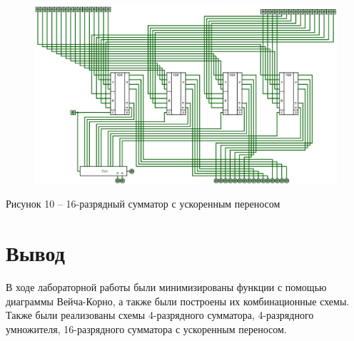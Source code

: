 \documentclass[a4paper,14pt]{extarticle}
\begin{document}
  \begin{figure}[h]
    \centering
    \includegraphics[width=1\linewidth]{images/s-4-4}
  \end{figure}
  \begin{center}
    Рисунок 10 – 16-разрядный сумматор с ускоренным переносом
  \end{center}
  
  \newpage
  \section*{Вывод}
  В ходе лабораторной работы были минимизированы функции с помощью диаграммы Вейча-Корно, а также были построены их комбинационные схемы. Также были реализованы схемы 4-разрядного сумматора, 4-разрядного умножителя, 16-разрядного сумматора с ускоренным переносом.
  
\end{document}
